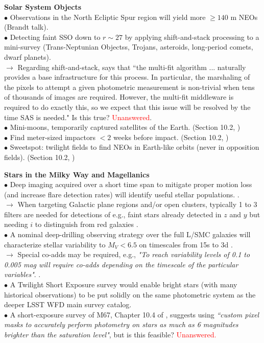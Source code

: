 \documentclass[DM,lsstdraft,toc]{lsstdoc}
\begin{document}
\medskip
\noindent \textbf{Solar System Objects}\\
$\bullet$ Observations in the North Ecliptic Spur region will yield more $\geq140$ m NEOs (Brandt talk). \\
$\bullet$ Detecting faint SSO down to $r\sim27$ by applying shift-and-stack processing to a mini-survey (Trans-Neptunian Objectss, Trojans, asteroids, long-period comets, dwarf planets). \citep{BeckerWP} \\
$\rightarrow$ Regarding shift-and-stack, \cite{BeckerWP} says that ``the multi-fit algorithm ... naturally provides a base infrastructure for this process. In particular, the marshaling of the pixels to attempt a given photometric measurement is non-trivial when tens of thousands of images are required. However, the multi-fit middleware is required to do exactly this, so we expect that this issue will be resolved by the time SAS is needed." Is this true? \textcolor{red}{Unanswered}. \\
$\bullet$ Mini-moons, temporarily captured satellites of the Earth. (Section 10.2, \cite{OSWP}) \\
$\bullet$ Find meter-sized impactors $<2$ weeks before impact.  (Section 10.2, \cite{OSWP}) \\
$\bullet$ Sweetspot: twilight fields to find NEOs in Earth-like orbits (never in opposition fields). (Section 10.2, \cite{OSWP}) 

\noindent \textbf{Stars in the Milky Way and Magellanics} \\
$\bullet$ Deep imaging acquired over a short time span to mitigate proper motion loss (and increase flare detection rates) will identify useful stellar populations. \citep{DhitalWP}. \\
$\rightarrow$ When targeting Galactic plane regions and/or open clusters, typically 1 to 3 filters are needed for detections of e.g., faint stars already detected in $z$ and $y$ but needing $i$ to distinguish from red galaxies \cite{DhitalWP}. \\
$\bullet$ A nominal deep-drilling observing strategy over the full L/SMC galaxies will characterize stellar variability to $M_V<6.5$ on timescales from 15s to 3d \cite{SzkodyWP}. \\
$\rightarrow$ Special co-adds may be required, e.g., {\it "To reach variability levels of 0.1 to 0.005 mag will require co-adds depending on the timescale of the particular variables"}. \citep{SzkodyWP}. \\
$\bullet$ A Twilight Short Exposure survey would enable bright stars (with many historical observations) to be put solidly on the same photometric system as the deeper LSST WFD main survey catalog. \\
$\bullet$ A short-exposure survey of M67, Chapter 10.4 of \cite{OSWP}, suggests using {\it ``custom pixel masks to accurately perform photometry on stars as much as 6 magnitudes brighter than the saturation level"}, but is this feasible? \textcolor{red}{Unanswered.} 
\end{document}
